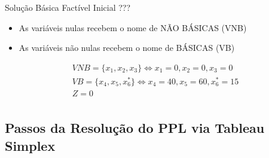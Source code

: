 \begin{frame}
	{
		\begin{block}{Solução Básica Factível Inicial ???}
			\only<5>
			{
			\begin{itemize}
				\item As {\color{red}variáveis nulas} recebem o nome de {\color{red}NÃO BÁSICAS (VNB)}
				\item As {\color{red}variáveis não nulas} recebem o nome de {\color{red}BÁSICAS (VB)} 
			\end{itemize}
			}
			{
				\begin{equation*}
					\begin{matrix}
						VNB = \{ x_1,x_2,x_3 \} \Leftrightarrow x_1=0, x_2=0, x_3=0 \\
						VB = \{ x_4,x_5,x_6^{*} \} \Leftrightarrow x_4=40, x_5=60, x_6^{*}=15 \\
						Z = 0 \\
					\end{matrix}
				\end{equation*}
			}
		\end{block}
	}

\end{frame}


\subsection{Passos da Resolução do PPL via Tableau Simplex}

